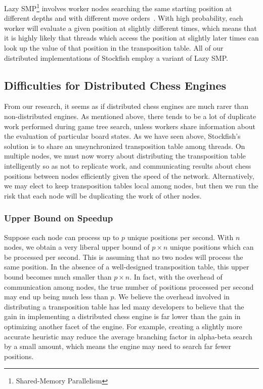 \documentclass{article}
\begin{document}
Lazy SMP\footnote{Shared-Memory Parallelism} involves worker nodes searching the
same starting position at different depths and with different move
orders~\cite{LazySMP}.
With high probability, each worker will evaluate a given position at
slightly different times, which means that it is highly likely that
threads which access the position at slightly later times
can look up the value of that position in the transposition table. All
of our distributed implementations of Stockfish employ a variant of Lazy SMP.

\subsection{Difficulties for Distributed Chess Engines}
From our research, it seems as if distributed chess engines are much rarer than
non-distributed engines. 
As mentioned above, there tends to be a lot of duplicate work performed during
game tree search, unless workers share information about the evaluation of
particular board states. As we have seen above, Stockfish's
solution is to share an unsynchronized transposition table among threads. On
multiple nodes, we must now worry about distributing the transposition table
intelligently so as not to replicate work, and communicating results about chess positions between
nodes efficiently given the speed of the network. Alternatively, we may elect
to keep transposition tables local among nodes, but then we run the risk that
each node will be duplicating the work of other nodes.

\subsubsection{Upper Bound on Speedup}
Suppose each node can process up to $p$ unique positions per second. With $n$ nodes, we
obtain a very liberal upper bound of $p\times n$ unique positions which can be processed per
second. This is assuming that no two nodes will process the same position. In
the absence of a well-designed transposition table, this upper bound becomes
much smaller than $p \times n$. In fact, with the overhead of communication
among nodes, the true number of positions processed per second may end up being
much less than $p$. We believe the overhead involved in distributing a
transposition table has led many developers to believe that the gain in
implementing a distributed chess engine is far lower than the gain in
optimizing another facet of the engine. For example, creating a slightly
more accurate heuristic may reduce the average branching factor in alpha-beta
search by a small amount, which means the engine may need to search far fewer
positions.
\end{document}
